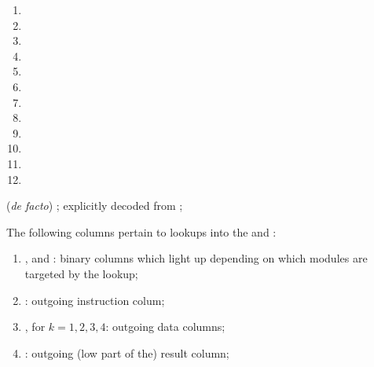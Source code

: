 \begin{enumerate}
\begin{multicols}{3}
\begin{enumerate}
				\item \oobInstIsModexpLead{}
				\item \oobInstIsModexpPricing{}
				\item \oobInstIsModexpExtract{}
				\item \oobInstIsPointEvaluation{}
				\item \oobInstIsBlsGOneAdd{}
				\item \oobInstIsBlsGOneMsm{}
				\item \oobInstIsBlsGTwoAdd{}
				\item \oobInstIsBlsGTwoMsm{}
				\item \oobInstIsBlsPairingCheck{}
				\item \oobInstIsBlsMapFpToGOne{}
				\item \oobInstIsBlsMapFpTwoToGTwo{}
				\item[\vspace{\fill}]
			\end{enumerate}
		\end{multicols}
		(\emph{de facto}) \ccbc{}; explicitly decoded from ;
\end{enumerate}
The following columns pertain to lookups into the \wcpMod{} and \addMod{}:
\begin{enumerate}[resume]
	\item \wcpFlag{}, \addFlag{} and \modFlag{}:
		binary columns which light up depending on which modules are targeted by the lookup;
	\item \outgoingInst{}:
		outgoing instruction colum;
	\item {}, for $k = 1, 2, 3, 4$:
		outgoing data columns;
	\item \outgoingResLo{}:
		outgoing (low part of the) result column;
\end{enumerate}
